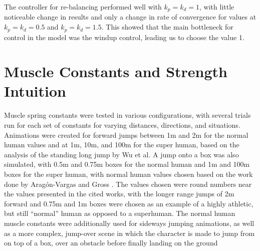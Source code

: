 The controller for re-balancing performed well with $k_p = k_d = 1$, with little noticeable change in results and only a change in rate of convergence for values at $k_p = k_d = 0.5$ and $k_p = k_d = 1.5$.  This showed that the main bottleneck for control in the model was the windup control, leading us to choose the value 1.

\section{Muscle Constants and Strength Intuition}
\label{section:muscle_results}
Muscle spring constants were tested in various configurations, with several trials run for each set of constants for varying distances, directions, and situations.  Animations were created for forward jumps between 1m and 2m for the normal human values and at 1m, 10m, and 100m for the super human, based on the analysis of the standing long jump by Wu et al\cite{longjump}.  A jump onto a box was also simulated, with 0.5m and 0.75m boxes for the normal human and 1m and 100m boxes for the super human, with normal human values chosen based on the work done by Arag\'{o}n-Vargas and Gross \cite{vertjump}.  The values chosen were round numbers near the values presented in the cited works, with the longer range jumps of 2m forward and 0.75m and 1m boxes were chosen as an example of a highly athletic, but still ``normal'' human as opposed to a superhuman.  The normal human muscle constants were additionally used for sideways jumping animations, as well as a more complex, jump-over scene in which the character is made to jump from on top of a box, over an obstacle before finally landing on the ground

